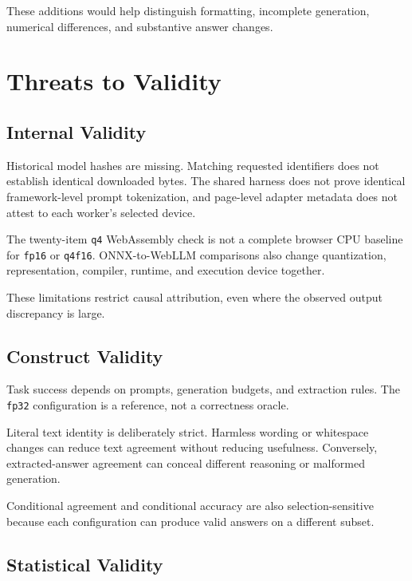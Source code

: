 \documentclass[conference]{IEEEtran}
\newcommand{\fp}{\texttt{fp32}}
\newcommand{\fphalf}{\texttt{fp16}}
\newcommand{\qfour}{\texttt{q4}}
\newcommand{\qfourhalf}{\texttt{q4f16}}
\begin{document}
These additions would help distinguish formatting,
incomplete generation, numerical differences, and
substantive answer changes.


\section{Threats to Validity}
\label{sec:limitations}

\subsection{Internal Validity}

Historical model hashes are missing.
Matching requested identifiers does not establish identical
downloaded bytes.
The shared harness does not prove identical framework-level
prompt tokenization, and page-level adapter metadata does
not attest to each worker's selected device.

The twenty-item \qfour{} WebAssembly check is not a complete
browser CPU baseline for \fphalf{} or \qfourhalf{}.
ONNX-to-WebLLM comparisons also change quantization,
representation, compiler, runtime, and execution device
together.

These limitations restrict causal attribution, even where
the observed output discrepancy is large.


\subsection{Construct Validity}

Task success depends on prompts, generation budgets, and
extraction rules.
The \fp{} configuration is a reference, not a correctness
oracle.

Literal text identity is deliberately strict.
Harmless wording or whitespace changes can reduce text
agreement without reducing usefulness.
Conversely, extracted-answer agreement can conceal
different reasoning or malformed generation.

Conditional agreement and conditional accuracy are also
selection-sensitive because each configuration can produce
valid answers on a different subset.


\subsection{Statistical Validity}
\end{document}
